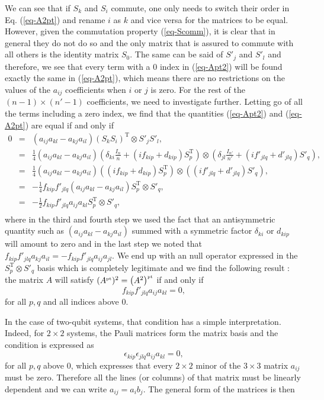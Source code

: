 We can see that if $S_k$ and $S_i$ commute, one only needs to switch their order in Eq. (\ref{eq-A2pt}) and rename $i$ as $k$ and vice versa for the matrices to be equal. However, given the commutation property (\ref{eq-Scomm}), it is clear that in general they do not do so and the only matrix that is assured to commute with all others is the identity matrix $S_0$. The same can be said of $S'_j$ and $S'_l$ and therefore, we see that every term with a $0$ index in (\ref{eq-Apt2}) will be found exactly the same in (\ref{eq-A2pt}), which means there are no restrictions on the values of the $a_{ij}$ coefficients when $i$ or $j$ is zero. For the rest of the $(n-1)\times(n'-1)$ coefficients, we need to investigate  further. Letting go of all the terms including a zero index, we find that the quantities (\ref{eq-Apt2}) and (\ref{eq-A2pt}) are equal if and only if
\begin{eqnarray}
  0 &=& (a_{ij} a_{kl}-a_{kj} a_{il})  (S_k S_i)^{\textrm{T}}  \otimes S'_j S'_l, \\
  &=& \frac 1 4 (a_{ij} a_{kl}-a_{kj} a_{il}) \left( \delta_{ki} \frac{I_n}n + (if_{kip} + d_{kip})S_p^{\textrm{T}}  \right)\otimes \left(\delta_{jl} \frac{I_{n'}}{n'} +(if'_{jlq} + d'_{jlq}) S'_q\right), \nonumber \\
  &=& \frac 1 4 (a_{ij} a_{kl}-a_{kj} a_{il}) \left( (if_{kip} + d_{kip}) S_p^{\textrm{T}} \right)\otimes \left((if'_{jlq} + d'_{jlq}) S'_q\right),\\
  &=&  -\frac 1 4 f_{kip}f'_{jlq}   (a_{ij} a_{kl}-a_{kj} a_{il})  S_p^{\textrm{T}}  \otimes S'_q ,\\
  &=&  -\frac 1 2  f_{kip}f'_{jlq}  a_{ij} a_{kl} S_p^{\textrm{T}}  \otimes S'_q, \\
\end{eqnarray}
where in the third and fourth step we used the fact that an antisymmetric quantity such as  $(a_{ij} a_{kl}-a_{kj} a_{il})$ summed with a symmetric factor $	\delta_{ki}$ or $d_{kip}$ will amount to zero and in the last step we noted that $f_{kip}f'_{jlq} a_{kj} a_{il}=-f_{kip}f'_{jlq} a_{ij} a_{jl}$. We end up with an null operator expressed in the  $S_p^{\textrm{T}}  \otimes S'_q$ basis which is completely legitimate and we find the following result : the matrix $A$ will satisfy $(A^{\mbox{\tiny \textup{pt}}})^2 = \left(A^2 \right)^{\mbox{\tiny \textup{pt}}}$  if and only if
\[ f_{kip}f'_{jlq}  a_{ij} a_{kl}=0 , \]
for all $p, q$ and all indices above 0.

In the case of two-qubit systems, that condition has a simple interpretation. Indeed, for $2\times 2$ systems, the Pauli matrices form the matrix basis and the condition is expressed as
\[ \epsilon_{kip}\epsilon_{jlq}  a_{ij} a_{kl}=0 , \]
for all $p,q$ above 0, which  expresses that every $2\times 2$ minor of the $3\times 3$ matrix $a_{ij}$ must be zero. Therefore all the lines (or columns) of that matrix must be linearly dependent and we can write $ a_{ij}=a_i b_j$. The general form of the matrices is then

